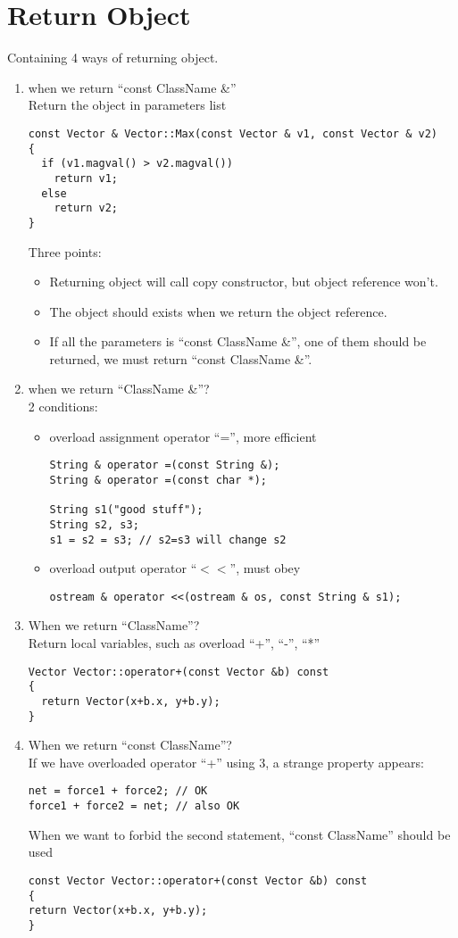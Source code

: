 \documentclass[10pt,a4paper,oneside]{article}
\begin{document}
\section{Return Object}
Containing 4 ways of returning object.
\begin{enumerate}[1.]
\item when we return ``const ClassName \&''\\
Return the object in parameters list
\begin{lstlisting}
const Vector & Vector::Max(const Vector & v1, const Vector & v2)
{
  if (v1.magval() > v2.magval())
    return v1;
  else
    return v2;
}
\end{lstlisting}
Three points:
\begin{itemize}
	\item Returning object will call copy constructor, but object reference won't.
	\item The object should exists when we return the object reference.
	\item If all the parameters is ``const ClassName \&'', one of them should be returned, we must return ``const ClassName \&''.
\end{itemize}
\item when we return ``ClassName \&''?\\
2 conditions:
\begin{itemize}
\item overload assignment operator ``='', more efficient
\begin{lstlisting}
String & operator =(const String &);
String & operator =(const char *);

String s1("good stuff");
String s2, s3;
s1 = s2 = s3; // s2=s3 will change s2
\end{lstlisting}
\item overload output operator ``$\mathbf{<<}$'', must obey
\begin{lstlisting}
ostream & operator <<(ostream & os, const String & s1);
\end{lstlisting}
\end{itemize}
\item When we return ``ClassName''?\\
Return local variables, such as overload ``+'', ``-'', ``*''
\begin{lstlisting}
Vector Vector::operator+(const Vector &b) const
{
  return Vector(x+b.x, y+b.y);
} 
\end{lstlisting}
\item When we return ``const ClassName''?\\
If we have overloaded operator ``+'' using 3, a strange property appears:
\begin{lstlisting}
net = force1 + force2; // OK
force1 + force2 = net; // also OK
\end{lstlisting}
When we want to forbid the second statement, ``const ClassName'' should be used
\begin{lstlisting}
const Vector Vector::operator+(const Vector &b) const
{
return Vector(x+b.x, y+b.y);
} 
\end{lstlisting}
\end{enumerate}
\end{document}
